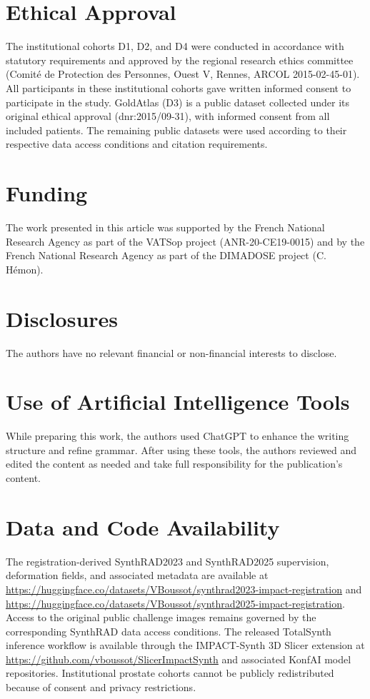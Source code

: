 \documentclass{article}
\begin{document}
\section{Ethical Approval}
\label{sec:ethics}
The institutional cohorts D1, D2, and D4 were conducted in accordance with statutory requirements and approved by the regional research ethics committee (Comité de Protection des Personnes, Ouest V, Rennes, ARCOL 2015-02-45-01). All participants in these institutional cohorts gave written informed consent to participate in the study. GoldAtlas (D3) is a public dataset collected under its original ethical approval (dnr:2015/09-31), with informed consent from all included patients. The remaining public datasets were used according to their respective data access conditions and citation requirements.

\section{Funding}
\label{sec:acknowledgments}
The work presented in this article was supported by the French National Research Agency as part of the VATSop project (ANR-20-CE19-0015) and by the French National Research Agency as part of the DIMADOSE project (C. Hémon).

\section{Disclosures}
The authors have no relevant financial or non-financial interests to disclose.

\section{Use of Artificial Intelligence Tools}
While preparing this work, the authors used ChatGPT to enhance the writing structure and refine grammar. After using these tools, the authors reviewed and edited the content as needed and take full responsibility for the publication's content.

\section{Data and Code Availability}
The registration-derived SynthRAD2023 and SynthRAD2025 supervision, deformation fields, and associated metadata are available at \url{https://huggingface.co/datasets/VBoussot/synthrad2023-impact-registration} and \url{https://huggingface.co/datasets/VBoussot/synthrad2025-impact-registration}. Access to the original public challenge images remains governed by the corresponding SynthRAD data access conditions. The released TotalSynth inference workflow is available through the IMPACT-Synth 3D Slicer extension at \url{https://github.com/vboussot/SlicerImpactSynth} and associated KonfAI model repositories. Institutional prostate cohorts cannot be publicly redistributed because of consent and privacy restrictions.
\end{document}
